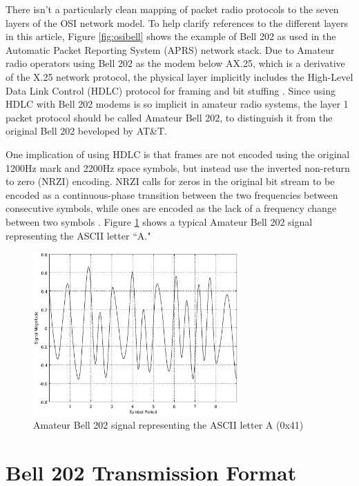 \documentclass[12pt,letterpaper]{article}
\begin{document}
There isn't a particularly clean
mapping of packet radio protocols to the seven layers of the OSI
network model. To help clarify references to the different layers in this article,
Figure \ref{fig:osibell} shows the example of Bell 202 as used in the 
Automatic Packet Reporting System (APRS) network stack.
Due to Amateur radio operators
using Bell 202 as the modem below AX.25, which is a derivative of
the X.25 network protocol, 
the physical layer implicitly includes the High-Level Data Link Control (HDLC) 
protocol for framing and bit stuffing \cite{n1vgphy}.
Since using HDLC with Bell 202 modems is so implicit in amateur radio systems, 
the layer 1 packet protocol should be called Amateur Bell 202, to
distinguish it from the original Bell 202 beveloped by AT\&T.

One implication of using HDLC is that frames are not encoded using the
original 1200Hz mark and 2200Hz space symbols,
but instead use the
inverted non-return to zero (NRZI) encoding.
NRZI calls for zeros in the original bit stream to be encoded as a
continuous-phase transition between the two frequencies between consecutive symbols, 
while ones are encoded as
the lack of a frequency change between two symbols \cite{iso13239}.
Figure \ref{fig:bell202sample} shows a typical Amateur Bell 202
signal representing the ASCII letter ``A."

\begin{figure}
	\centering
	\includegraphics[width=0.7\textwidth]{src/octave/bell202A}
	\caption{Amateur Bell 202 signal representing the ASCII letter A (0x41)}
	\label{fig:bell202sample}
\end{figure}


\section{Bell 202 Transmission Format}
\end{document}
